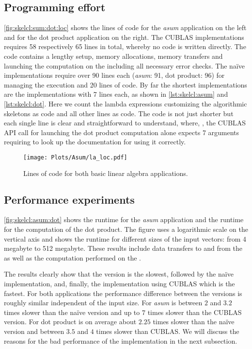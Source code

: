 \subsection*{Programming effort}
\autoref{fig:skelcl:sum:dot:loc} shows the lines of code for the \emph{asum} application on the left and for the dot product application on the right.
The CUBLAS implementations requires 58 respectively 65 lines in total, whereby no \GPU code is written directly.
The code contains a lengthy setup, memory allocations, memory transfers and launching the computation on the \GPU including all necessary error checks.
The na{\"i}ve \OpenCL implementations require over 90 lines each (\emph{asum}: 91, dot product: 96) for managing the \GPU execution and 20 lines of \GPU code.
By far the shortest implementations are the \SkelCL implementations with 7 lines each, as shown in \autoref{lst:skelcl:asum} and \autoref{lst:skelcl:dot}.
Here we count the lambda expressions customizing the algorithmic skeletons as \GPU code and all other lines as \CPU code.
The code is not just shorter but each single line is clear and straightforward to understand, where, \eg,  the CUBLAS API call for launching the dot product computation alone expects 7 arguments requiring to look up the documentation for using it correctly.

\begin{figure}
  \centering
  \texttt{[image: Plots/Asum/la\_loc.pdf]}
  \caption{Lines of code for both basic linear algebra applications.}
  \label{fig:skelcl:sum:dot:loc}
\end{figure}

\subsection*{Performance experiments}
\autoref{fig:skelcl:asum:dot} shows the runtime for the \emph{asum} application and the runtime for the computation of the dot product.
The figure uses a logarithmic scale on the vertical axis and shows the runtime for different sizes of the input vectors: from 4 megabyte to 512 megabyte.
These results include data transfers to and from the \GPU as well as the computation performed on the \GPU.

The results clearly show that the \SkelCL version is the slowest, followed by the na{\"i}ve \OpenCL implementation, and, finally, the implementation using CUBLAS which is the fastest.
For both applications the performance difference between the versions is roughly similar independent of the input size.
For \emph{asum} \SkelCL is between $2$ and $3.2$ times slower than the na{\"i}ve \OpenCL version and up to $7$ times slower than the CUBLAS version.
For dot product \SkelCL is on average about $2.25$ times slower than the na{\"i}ve \OpenCL version and between $3.5$ and $4$ times slower than CUBLAS.
We will discuss the reasons for the bad performance of the \SkelCL implementation in the next subsection.

